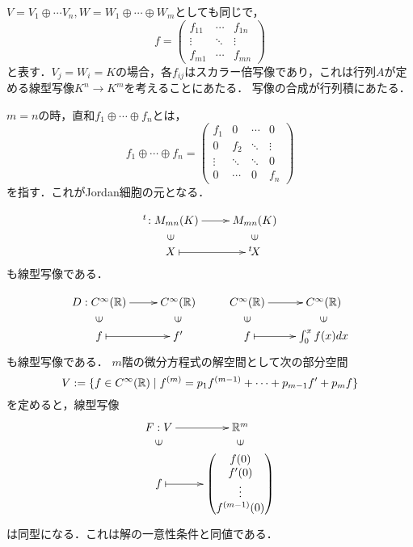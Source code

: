 \documentclass[uplatex, 12pt, dvipdfmx]{jsreport}
\begin{document}
\begin{remark}[一般化された行列]
    $V=V_1\oplus\cdots V_n,W=W_1\oplus\cdots\oplus W_m$としても同じで，
    \[ f=\begin{pmatrix}f_{11}&\cdots&f_{1n}\\\vdots&\ddots&\vdots\\f_{m1}&\cdots&f_{mn}\end{pmatrix} \]
    と表す．$V_j=W_i=K$の場合，各$f_{ij}$はスカラー倍写像であり，これは行列$A$が定める線型写像$K^n\to K^m$を考えることにあたる．
    写像の合成が行列積にあたる．

    $m=n$の時，直和$f_1\oplus\cdots\oplus f_n$とは，
    \[ f_1\oplus\cdots\oplus f_n=\begin{pmatrix}f_{1}&0&\cdots&0\\0&f_2&\ddots&\vdots\\\vdots&\ddots&\ddots&0\\0&\cdots&0&f_{n}\end{pmatrix} \]
    を指す．これがJordan細胞の元となる．
\end{remark}

\begin{example}[行列内の演算]
    \[\xymatrix@R-2pc{
        {}^t\!:M_{mn}(K)\ar[r]&M_{mn}(K)\\
        \rotatebox[origin=c]{90}{$\in$}&\rotatebox[origin=c]{90}{$\in$}\\
        X\ar@{|->}[r]&{}^t\!X
    }\]
    も線型写像である．
\end{example}

\begin{example}[微分演算子]
    \[\xymatrix@R-2pc{
        D:C^{\infty}(\R)\ar[r]&C^\infty(\R)&C^{\infty}(\R)\ar[r]&C^\infty(\R)\\
        \rotatebox[origin=c]{90}{$\in$}&\rotatebox[origin=c]{90}{$\in$}&\rotatebox[origin=c]{90}{$\in$}&\rotatebox[origin=c]{90}{$\in$}\\
        f\ar@{|->}[r]&f'&f\ar@{|->}[r]&\int^x_0f(x)dx
    }\]
    も線型写像である．
    $m$階の微分方程式の解空間として次の部分空間
    \[V:=\{f\in C^\infty(\mathbb{R})\mid f^{(m)}=p_1f^{(m-1)}+\cdots+p_{m-1}f'+p_mf\}\]
    を定めると，線型写像
    \[\xymatrix@R-2pc{
        F:V\ar[r]&\R^m\\
        \rotatebox[origin=c]{90}{$\in$}&\rotatebox[origin=c]{90}{$\in$}\\
        f\ar@{|->}[r]&{\begin{pmatrix}f(0)\\f'(0)\\\vdots\\f^{(m-1)}(0)\end{pmatrix}}
    }\]
    は同型になる．これは解の一意性条件と同値である．
\end{example}
\end{document}
